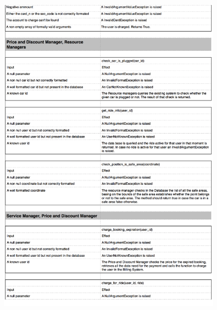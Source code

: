 \documentclass[a4paper,10pt]{article}
\begin{document}
    \begin{figure}[!h]
  \centering
    \includegraphics[scale=0.26]{Resources/5.png}
  \end{figure}
\end{document}
